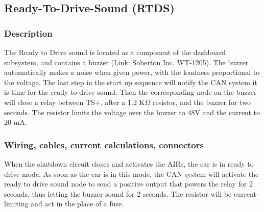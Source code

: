 \documentclass{article}
\begin{document}
\subsection{Ready-To-Drive-Sound (RTDS)}
\subsubsection{Description}
The Ready to Drive sound is located as a component of the dashboard subsystem, and contains a buzzer (\href{http://cirlw3yrzg4afc1x47lv2k18.wpengine.netdna-cdn.com/wp-content/uploads/2016/12/WT-1205-new.pdf}{Link: Soberton Inc. WT-1205}). The buzzer automatically makes a noise when given power, with the loudness proportional
to the voltage. The last step in the start up sequence will notify the CAN system it is time for the ready
to drive sound. Then the corresponding node on the buzzer will close a relay between TS+, after a 1.2 K$\Omega$
resistor, and the buzzer for two seconds. The resistor limits the voltage over the buzzer to 48V
and the current to 20 mA.
\subsubsection{Wiring, cables, current calculations, connectors}
When the shutdown circuit closes and activates the AIRs, the car is in ready to drive mode. As soon as the
car is in this mode, the CAN system will activate the ready to drive sound node to send a positive output
that powers the relay for 2 seconds, thus letting the buzzer sound for 2 seconds. The resistor will be current-limiting and act in the place of a fuse.
\end{document}
